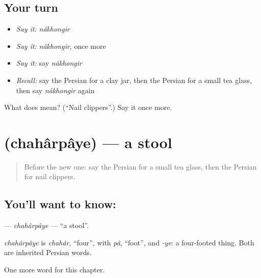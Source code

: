 \subsection*{Your turn}
\begin{itemize}
\raggedright
  \item \emph{Say it:} \emph{nâkhongir}
  \item \emph{Say it:} \emph{nâkhongir}, once more
  \item \emph{Say it:} say \emph{nâkhongir}
  \item \emph{Recall:} say the Persian for a clay jar, then the Persian for a small tea glass, then say \emph{nâkhongir} again
\end{itemize}

\begin{tcolorbox}[breakable,colback=teal!4,colframe=teal!35!black,title={Before you move on}]
What does  mean? (\textquotedblleft{}Nail clippers\textquotedblright{}.) Say it once more.
\end{tcolorbox}
\section[\texorpdfstring{\fa{چهارپایه} (chahârpâye)}{چهارپایه (chahârpâye)}]{ (chahârpâye) — a stool}

\label{lesson:FA-C213-chaharpaye}



\begin{quote}
Before the new one: say the Persian for a small tea glass, then the Persian for nail clippers.
\end{quote}

\subsection*{You'll want to know: }
\textbf{} — \emph{chahârpâye} — \textquotedblleft{}a stool\textquotedblright{}.

\begin{cousinweb}
\emph{chahârpâye} is \emph{chahâr}, \textquotedblleft{}four\textquotedblright{}, with \emph{pâ}, \textquotedblleft{}foot\textquotedblright{}, and \emph{-ye}: a four-footed thing. Both are inherited Persian words.
\end{cousinweb}

\begin{grammarlens}[title={What you've built}]
One more word for this chapter.
\end{grammarlens}


